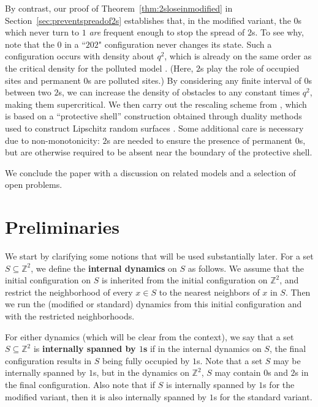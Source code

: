 \documentclass{article}
\newcommand{\df}[1]{\textbf{#1}}
\newcommand{\bZ}{{\mathbb Z}}
\numberwithin{equation}{section}
\begin{document}
       By contrast, our proof of Theorem~\ref{thm:2sloseinmodified} in Section~\ref{sec:preventspreadof2s} establishes that, 
       in the modified variant, the $0$s which 
       never turn to $1$ {\it are\/} frequent enough to stop the spread 
       of $2$s. To see why, note that the $0$ in a ``$202$" configuration never changes its state. Such a configuration occurs with density about $q^2$, 
       which is already on the same order as the critical density for 
       the polluted model \cite{Gravner1997}. (Here, $2$s play the role of occupied sites and permanent 
       $0$s are polluted sites.) By considering any finite interval of 
       $0$s between two $2$s, we can increase the density of obstacles
       to any constant times $q^2$, making them supercritical.  We then 
       carry out the rescaling scheme from \cite{GS2020}, which is based on a ``protective shell'' construction obtained through duality methods used to construct Lipschitz random surfaces \cite{LipPerc, GrimmettHolroyd10, GrimmettHolroyd12}. Some 
       additional care is necessary due to non-monotonicity: 
       $2$s are needed 
       to ensure the presence of permanent $0$s, but are
       otherwise required to be absent near the boundary of the protective shell. 

       We conclude the paper with a discussion on related models and 
       a selection of open problems.


\section{Preliminaries}

We start by clarifying some notions that will be used substantially later.
For a set $S\subseteq \bZ^2$, we define the \textbf{internal dynamics} on $S$ as follows. 
We assume that the initial configuration on $S$ is inherited from the initial configuration on $\bZ^2$, and restrict the neighborhood of every $x\in S$ to the nearest neighbors of $x$ in $S$. 
Then we run the (modified or standard) dynamics from this initial configuration and with the restricted neighborhoods.

For either dynamics (which will be clear from the context), we say that a set $S\subseteq \bZ^2$ is \df{internally spanned by $1$s} if in the internal dynamics on $S$, the final configuration results in $S$ being fully occupied by $1$s. 
Note that a set $S$ may be internally spanned by $1$s, but in the dynamics on $\bZ^2$, $S$ may contain $0$s and $2$s in the final configuration. Also note that if $S$ is internally spanned by $1$s for the modified variant, then it is also internally spanned by $1$s for the standard variant.
\end{document}
